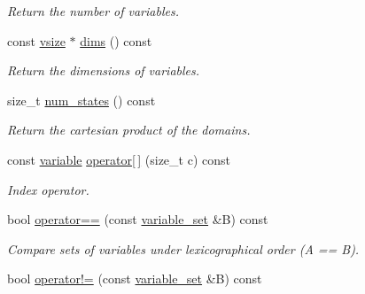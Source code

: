\begin{DoxyCompactItemize}
\begin{DoxyCompactList}\small\item\em Return the number of variables. \end{DoxyCompactList}\item 
\hypertarget{classmerlin_1_1variable__set_a406034ff9ce1d4789cf015bd3066386f}{}const \hyperlink{classmerlin_1_1variable__set_a05d7a8291564fa7fb236a5e9cb65c734}{vsize} $\ast$ \hyperlink{classmerlin_1_1variable__set_a406034ff9ce1d4789cf015bd3066386f}{dims} () const \label{classmerlin_1_1variable__set_a406034ff9ce1d4789cf015bd3066386f}

\begin{DoxyCompactList}\small\item\em Return the dimensions of variables. \end{DoxyCompactList}\item 
\hypertarget{classmerlin_1_1variable__set_aa468382bd1a35e5a682d80533e576266}{}size\+\_\+t \hyperlink{classmerlin_1_1variable__set_aa468382bd1a35e5a682d80533e576266}{num\+\_\+states} () const \label{classmerlin_1_1variable__set_aa468382bd1a35e5a682d80533e576266}

\begin{DoxyCompactList}\small\item\em Return the cartesian product of the domains. \end{DoxyCompactList}\item 
\hypertarget{classmerlin_1_1variable__set_aa10f4084fe699e1c62a7af92d6d8c501}{}const \hyperlink{classmerlin_1_1variable}{variable} \hyperlink{classmerlin_1_1variable__set_aa10f4084fe699e1c62a7af92d6d8c501}{operator\mbox{[}$\,$\mbox{]}} (size\+\_\+t c) const \label{classmerlin_1_1variable__set_aa10f4084fe699e1c62a7af92d6d8c501}

\begin{DoxyCompactList}\small\item\em Index operator. \end{DoxyCompactList}\item 
\hypertarget{classmerlin_1_1variable__set_ac978fa6aaa2afae98cf21ad656b8eb58}{}bool \hyperlink{classmerlin_1_1variable__set_ac978fa6aaa2afae98cf21ad656b8eb58}{operator==} (const \hyperlink{classmerlin_1_1variable__set}{variable\+\_\+set} \&B) const \label{classmerlin_1_1variable__set_ac978fa6aaa2afae98cf21ad656b8eb58}

\begin{DoxyCompactList}\small\item\em Compare sets of variables under lexicographical order (A == B). \end{DoxyCompactList}\item 
\hypertarget{classmerlin_1_1variable__set_a4283a6dd10d20ba2fd8ce788a3db4fbc}{}bool \hyperlink{classmerlin_1_1variable__set_a4283a6dd10d20ba2fd8ce788a3db4fbc}{operator!=} (const \hyperlink{classmerlin_1_1variable__set}{variable\+\_\+set} \&B) const \label{classmerlin_1_1variable__set_a4283a6dd10d20ba2fd8ce788a3db4fbc}


\end{DoxyCompactItemize}
